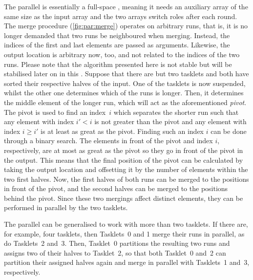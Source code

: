 The parallel \MS{} is essentially a full-space \MS{}, meaning it needs an auxiliary array of the same size as the input array and the two arrays switch roles after each round.
The merge procedure (\cref{fig:par:merge}) operates on arbitrary runs, that is, it is no longer demanded that two runs be neighboured when merging.
Instead, the indices of the first and last elements are passed as arguments.
Likewise, the output location is arbitrary now, too, and not related to the indices of the two runs.
Please note that the algorithm presented here is not stable but will be stabilised later on in this .
Suppose that there are but two tasklets and both have sorted their respective halves of the input.
One of the tasklets is now suspended, whilst the other one determines which of the runs is longer.
Then, it determines the middle element of the longer run, which will act as the aforementioned \emph{pivot}.
The pivot is used to find an index~\(i\) which separates the shorter run such that any element with index \(i' < i\) is not greater than the pivot and any element with index \(i \ge i'\) is at least as great as the pivot.
Finding such an index \(i\) can be done through a binary search.
The elements in front of the pivot and index \(i\), respectively, are at most as great as the pivot so they go in front of the pivot in the output.
This means that the final position of the pivot can be calculated by taking the output location and offsetting it by the number of elements within the two first halves.
Now, the first halves of both runs can be merged to the positions in front of the pivot, and the second halves can be merged to the positions behind the pivot.
Since these two mergings affect distinct elements, they can be performed in parallel by the two tasklets.

The parallel \MS{} can be generalised to work with more than two tasklets.
If there are, for example, four tasklets, then Tasklets~0 and 1 merge their runs in parallel, as do Tasklets~2 and~3.
Then, Tasklet~0 partitions the resulting two runs and assigns two of their halves to Tasklet~2, so that both Tasklet~0 and~2 can partition their assigned halves again and merge in parallel with Tasklets~1 and~3, respectively.





